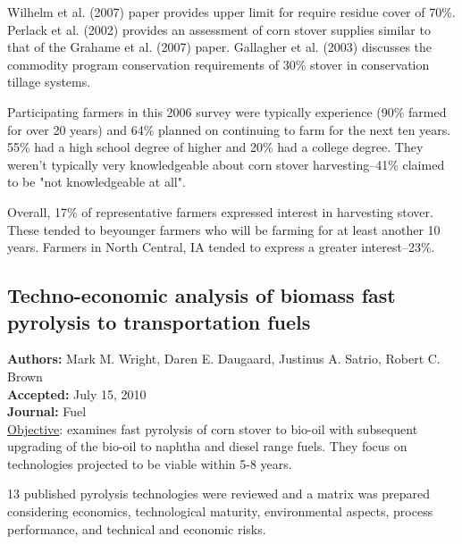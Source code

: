 \documentclass{article}\usepackage[]{graphicx}\usepackage[]{color}
\begin{document}
Wilhelm et al. (2007) paper provides upper limit for require residue cover of 70\%.  Perlack et al. (2002) provides an assessment of corn stover supplies similar to that of the Grahame et al. (2007) paper.  Gallagher et al. (2003) discusses the commodity program conservation requirements of 30\% stover in conservation tillage systems.  

Participating farmers in this 2006 survey were typically experience (90\% farmed for over 20 years) and 64\% planned on continuing to farm for the next ten years.  55\% had a high school degree of higher and 20\% had a college degree.  They weren't typically very knowledgeable about corn stover harvesting--41\% claimed to be "not knowledgeable at all".

Overall, 17\% of representative farmers expressed interest in harvesting stover.  These tended to beyounger farmers who will be farming for at least another 10 years.  Farmers in North Central, IA tended to express a greater interest--23\%.

\subsection{Techno-economic analysis of biomass fast pyrolysis to transportation fuels}
\textbf{Authors:} Mark M. Wright, Daren E. Daugaard, Justinus A. Satrio, Robert C. Brown \\
\textbf{Accepted:} July 15, 2010 \\
\textbf{Journal:} Fuel \\

\underline{Objective}: examines fast pyrolysis of corn stover to bio-oil with subsequent upgrading of the bio-oil to naphtha and diesel range fuels.  They focus on technologies projected to be viable within 5-8 years.

13 published pyrolysis technologies were reviewed and a matrix was prepared considering economics, technological maturity, environmental aspects, process performance, and technical and economic risks.
\end{document}

